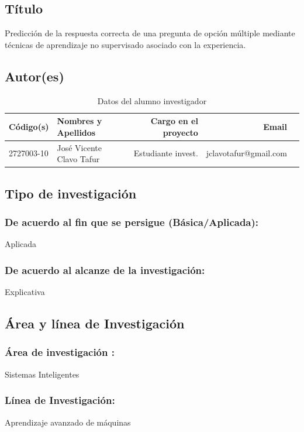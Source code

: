 \documentclass[a4paper, 12pt]{article}
\begin{document}
\subsection{Título}
Predicción de la respuesta correcta de una pregunta de opción múltiple mediante técnicas de aprendizaje no supervisado asociado con la experiencia.

\subsection{Autor(es)}
\begin{table}[h!]
 \caption{\small{Datos del alumno investigador}}
\begin{tabular}{llrrr} \toprule
{\bf Código(s)} & {\bf Nombres y Apellidos} & {\bf Cargo en el proyecto} & {\bf Email} \\ \midrule
2727003-10 & José Vicente Clavo Tafur & Estudiante invest. & jclavotafur@gmail.com     \\
\end{tabular}
\end{table}


\subsection{Tipo de investigación}
\subsubsection{De acuerdo al fin que se persigue (Básica/Aplicada):} 
Aplicada
                
\subsubsection{De acuerdo al alcanze de  la investigación:}
Explicativa

\subsection{Área y línea de Investigación}
\subsubsection{Área de investigación :} 
Sistemas Inteligentes
 
\subsubsection{Línea de Investigación:} 
Aprendizaje avanzado de máquinas
        
\end{document}
